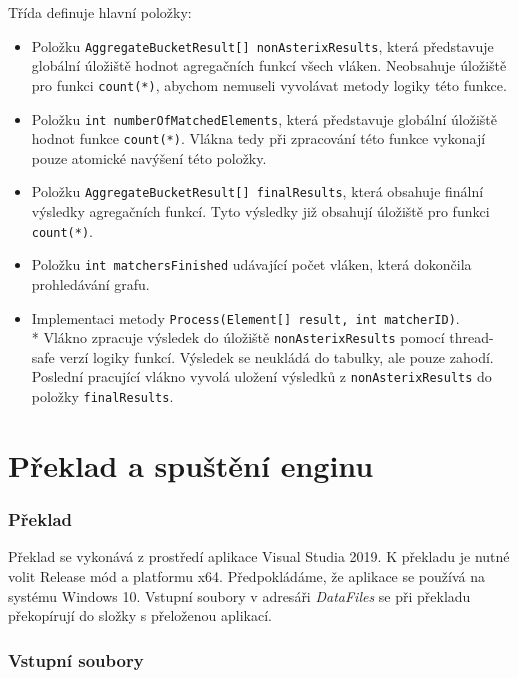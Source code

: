 Třída definuje hlavní položky:
\begin{itemize}
\item Položku \texttt{AggregateBucketResult[] nonAsterixResults}, která představuje globální úložiště hodnot agregačních funkcí všech vláken.
Neobsahuje úložiště pro funkci \texttt{count(*)}, abychom nemuseli vyvolávat metody logiky této funkce.
\item Položku \texttt{int numberOfMatchedElements}, která představuje globální úložiště hodnot funkce \texttt{count(*)}.
Vlákna tedy při zpracování této funkce vykonají pouze atomické navýšení této položky.
\item Položku \texttt{AggregateBucketResult[] finalResults}, která obsahuje finální výsledky agregačních funkcí.
Tyto výsledky již obsahují úložiště pro funkci \texttt{count(*)}.
\item Položku \texttt{int matchersFinished} udávající počet vláken, která dokončila prohledávání grafu.
\item Implementaci metody \texttt{Process(Element[] result, int matcherID)}.\\*
Vlákno zpracuje výsledek do úložiště \texttt{nonAsterixResults} pomocí thread-safe verzí logiky funkcí.
Výsledek se neukládá do tabulky, ale pouze zahodí.
Poslední pracující vlákno vyvolá uložení výsledků z \texttt{nonAsterixResults} do položky \texttt{finalResults}.
\end{itemize}

\section{Překlad a spuštění enginu}

\subsubsection{Překlad}

Překlad se vykonává z prostředí aplikace Visual Studia 2019.
K překladu je nutné volit Release mód a platformu x64.
Předpokládáme, že aplikace se používá na systému Windows 10.
Vstupní soubory v adresáři \textit{DataFiles} se při překladu překopírují do složky s přeloženou aplikací.

\subsubsection{Vstupní soubory}

